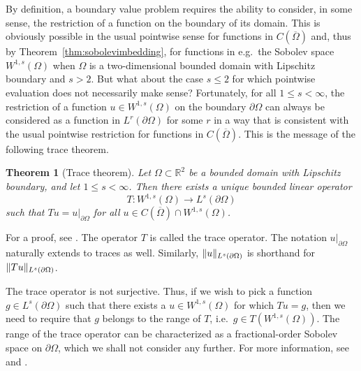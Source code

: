 \documentclass[english, 12pt, a4paper, sci, utf8, a-2b, online]{aaltothesis}
\theoremstyle{definition}
\theoremstyle{plain}
\newtheorem{theorem}{Theorem}[section]
\DeclarePairedDelimiter\norm{\lVert}{\rVert}
\numberwithin{equation}{section}
\begin{document}
By definition, a boundary value problem requires the ability to consider, in some sense,
the restriction of a function on the boundary of its domain.
This is obviously possible in the usual pointwise sense
for functions in $C(\overline{\Omega})$
and, thus by Theorem~\ref{thm:sobolevimbedding}, for functions
in e.g.\ the Sobolev space $W^{1,s}(\Omega)$
when $\Omega$ is a two-dimensional bounded domain with Lipschitz boundary
and $s > 2$. But what about the case $s \leq 2$ for which pointwise
evaluation does not necessarily make sense?
Fortunately, for all $1 \leq s < \infty$, the restriction of a function $u \in W^{1,s}(\Omega)$
on the boundary $\partial \Omega$ can always be considered as a function in $L^r(\partial \Omega)$
for some $r$ in a way that is consistent with the usual pointwise restriction
for functions in $C(\overline{\Omega})$.
This is the message of the following trace theorem.
\begin{theorem}[Trace theorem]
    \label{thm:tracetheorem}
    Let $\Omega \subset \mathbb{R}^2$ be a bounded domain with Lipschitz boundary,
    and let $1 \leq s < \infty$.
    Then there exists a unique bounded linear operator
    \begin{equation*}
        T: W^{1,s}(\Omega) \to L^s(\partial \Omega)   
    \end{equation*}
    such that $Tu = u|_{\partial \Omega}$ for all
    $u \in C(\overline{\Omega}) \cap W^{1,s}(\Omega)$.
\end{theorem}
For a proof,
see \cite[Theorem~4.2 on p.~79 and Theorem~4.6 on p.~81]{necas2011}.
The operator $T$ is called the trace operator.
The notation $u|_{\partial \Omega}$ naturally extends to traces as well.
Similarly, $\norm{u}_{L^s(\partial \Omega)}$ is shorthand for
$\norm{Tu}_{L^s(\partial \Omega)}$.

The trace operator is not surjective.
Thus, if we wish to pick a function $g \in L^s(\partial \Omega)$
such that there exists a $u \in W^{1,s}(\Omega)$ for which
$Tu = g$, then we need to require that $g$ belongs to the range of $T$, i.e.\
$g \in T(W^{1,s}(\Omega))$.
The range of the trace operator can be characterized as a fractional-order
Sobolev space on $\partial \Omega$, which we shall not consider
any further. For more information, see \cite{adams2003} and \cite{lions1972}.
\end{document}
